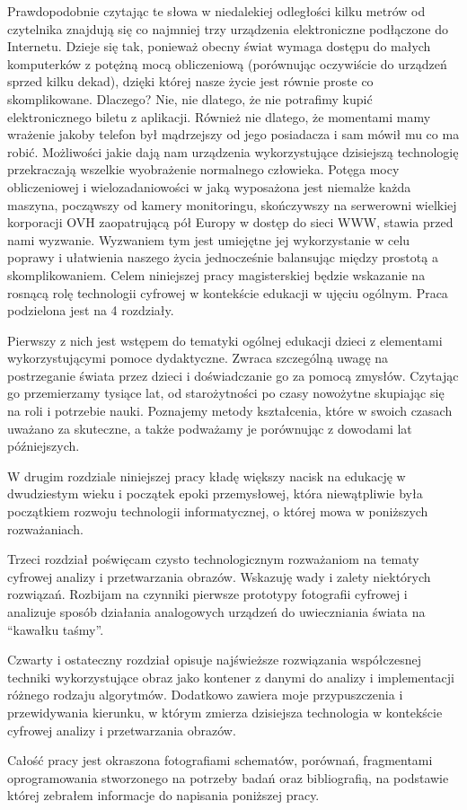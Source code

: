 \documentclass{article}
\begin{document}
\par
Prawdopodobnie czytając te słowa w niedalekiej odległości kilku metrów od czytelnika znajdują się co najmniej trzy urządzenia elektroniczne podłączone do Internetu. Dzieje się tak, ponieważ obecny świat wymaga dostępu do małych komputerków z potężną mocą obliczeniową (porównując oczywiście do urządzeń sprzed kilku dekad), dzięki której nasze życie jest równie proste co skomplikowane. Dlaczego? Nie, nie dlatego, że nie potrafimy kupić elektronicznego biletu z aplikacji. Również nie dlatego, że momentami mamy wrażenie jakoby telefon był mądrzejszy od jego posiadacza i sam mówił mu co ma robić. Możliwości jakie dają nam urządzenia wykorzystujące dzisiejszą technologię przekraczają wszelkie wyobrażenie normalnego człowieka. Potęga mocy obliczeniowej i wielozadaniowości w jaką wyposażona jest niemalże każda maszyna, począwszy od kamery monitoringu, skończywszy na serwerowni wielkiej korporacji OVH zaopatrującą pół Europy w dostęp do sieci WWW, stawia przed nami wyzwanie. Wyzwaniem tym jest umiejętne jej wykorzystanie w celu poprawy i ułatwienia naszego życia jednocześnie balansując między prostotą a skomplikowaniem.
Celem niniejszej pracy magisterskiej będzie wskazanie na rosnącą rolę technologii cyfrowej w kontekście edukacji w ujęciu ogólnym. Praca podzielona jest na 4 rozdziały.
\par 
Pierwszy z nich jest wstępem do tematyki ogólnej edukacji dzieci z elementami wykorzystującymi pomoce dydaktyczne. Zwraca szczególną uwagę na postrzeganie świata przez dzieci i doświadczanie go za pomocą zmysłów. Czytając go przemierzamy tysiące lat, od starożytności po czasy nowożytne skupiając się na roli i potrzebie nauki. Poznajemy metody kształcenia, które w swoich czasach uważano za skuteczne, a także podważamy je porównując z dowodami lat późniejszych.
\par
W drugim rozdziale niniejszej pracy kładę większy nacisk na edukację w dwudziestym wieku i początek epoki przemysłowej, która niewątpliwie była początkiem rozwoju technologii informatycznej, o której mowa w poniższych rozważaniach.
\par
Trzeci rozdział poświęcam czysto technologicznym rozważaniom na tematy cyfrowej analizy i przetwarzania obrazów. Wskazuję wady i zalety niektórych rozwiązań. Rozbijam na czynniki pierwsze prototypy fotografii cyfrowej i analizuje sposób działania analogowych urządzeń do uwieczniania świata na “kawałku taśmy”.
\par
Czwarty i ostateczny rozdział opisuje najświeższe rozwiązania współczesnej techniki wykorzystujące obraz jako kontener z danymi do analizy i implementacji różnego rodzaju algorytmów. Dodatkowo zawiera moje przypuszczenia i przewidywania kierunku, w którym zmierza dzisiejsza technologia w kontekście cyfrowej analizy i przetwarzania obrazów.
\par
Całość pracy jest okraszona fotografiami schematów, porównań, fragmentami oprogramowania stworzonego na potrzeby badań oraz bibliografią, na podstawie której zebrałem informacje do napisania poniższej pracy.
\end{document}
